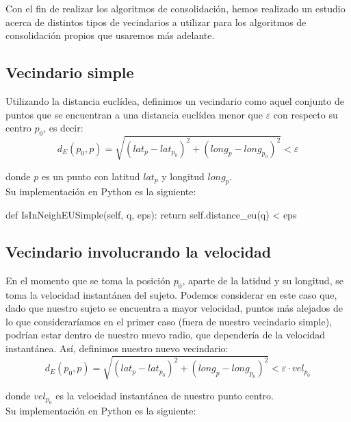 \documentclass[a4paper, 12pt, spanish]{article}
\begin{document}
Con el fin de realizar los algoritmos de consolidaci\'on, hemos realizado un estudio acerca de distintos tipos de vecindarios a utilizar para los algoritmos de consolidaci\'on propios que usaremos m\'as adelante.\\

\subsection{Vecindario simple}

Utilizando la distancia eucl\'idea, definimos un vecindario como aquel conjunto de puntos que se  encuentran a una distancia eucl\'idea menor que $\varepsilon$ con respecto su centro $p_0$, es decir:\\

$$ d_E(p_0, p) = \sqrt{(lat_{p} - lat_{p_0})^2 + (long_{p} - long_{p_0})^2 } < \varepsilon $$

donde $p$ es un punto con latitud $lat_{p}$ y longitud $long_{p}$.\\

Su implementaci\'on en Python es la siguiente:\\

\begin{python}
        def IsInNeighEUSimple(self, q, eps):
                return self.distance_eu(q) < eps
\end{python}


\subsection{Vecindario involucrando la velocidad}

En el momento que se toma la posici\'on $p_0$, aparte de la latidud y su longitud, se toma la velocidad instant\'anea del sujeto. Podemos considerar en este caso que, dado que nuestro sujeto se  encuentra a mayor velocidad, puntos m\'as alejados de lo que considerar\'iamos en el primer caso (fuera de nuestro vecindario simple), podr\'ian estar dentro de nuestro nuevo radio, que depender\'ia de la velocidad instant\'anea. As\'i, definimos nuestro nuevo vecindario:\\

$$ d_E(p_0, p) = \sqrt{(lat_{p} - lat_{p_0})^2 + (long_{p} - long_{p_0})^2 } < \varepsilon \cdot vel_{p_0} $$

donde $vel_{p_0}$ es la velocidad instant\'anea de nuestro punto centro.\\


Su implementaci\'on en Python es la siguiente:\\
\end{document}

